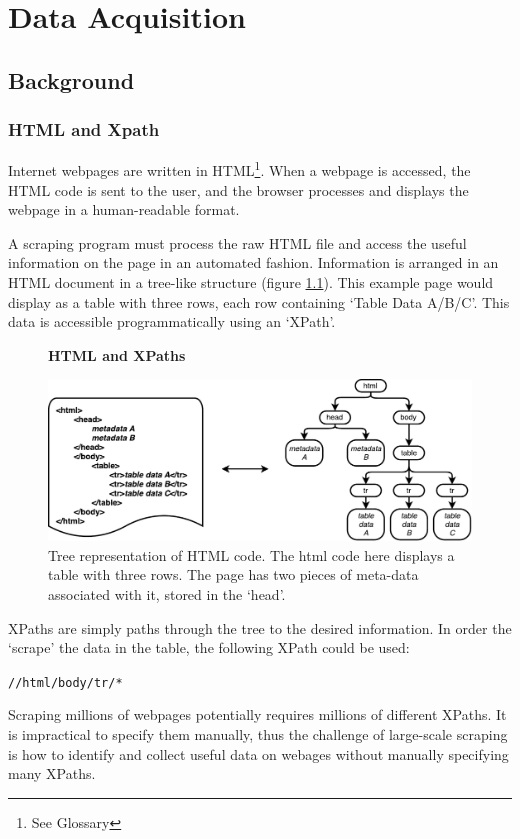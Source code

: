 \chapter{Data Acquisition}
\label{chapt:DATA_ACQUISITION}
\section{Background}
\subsection{HTML and Xpath}

Internet webpages are written in HTML\footnote{See Glossary}. When a webpage is accessed, the HTML code is sent to the user, and the browser processes and displays the webpage in a human-readable format. 

A scraping program must process the raw HTML file and access the useful information on the page in an automated fashion. Information is arranged in an HTML document in a tree-like structure (figure \ref{fig:HTMLTREE}). This example page would display as a table with three rows, each row containing `Table Data A/B/C'. This data is accessible programmatically using an `XPath'. 
\begin{figure}[H]
    \centering
    \textbf{HTML and XPaths}\par\medskip
    \includegraphics[width=\textwidth]{Data_Acquisition/html_tree.pdf}
    \caption[Tree representation of HTML Code]{Tree representation of HTML code. The html code here displays a table with three rows. The page has two pieces of meta-data associated with it, stored in the `head'.}
\label{fig:HTMLTREE}
\end{figure}
XPaths are simply paths through the tree to the desired information. In order the `scrape' the data in the table, the following XPath could be used:
\begin{center}
\texttt{//html/body/tr/*}
\end{center}
Scraping millions of webpages potentially requires millions of different XPaths. It is impractical to specify them manually, thus the challenge of large-scale scraping is how to identify and collect useful data on webages without manually specifying many XPaths.

